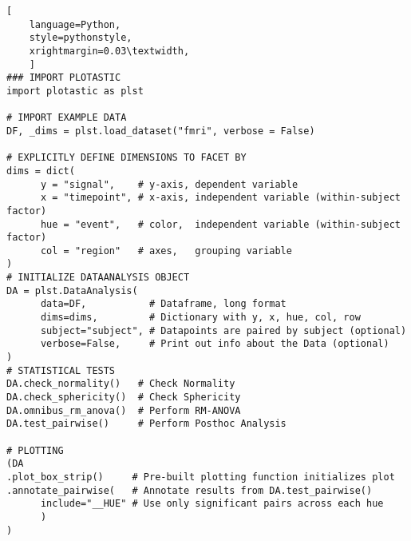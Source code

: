 \begin{lstlisting}[
    language=Python, 
    style=pythonstyle,
    xrightmargin=0.03\textwidth,
    ]
### IMPORT PLOTASTIC
import plotastic as plst

# IMPORT EXAMPLE DATA
DF, _dims = plst.load_dataset("fmri", verbose = False)

# EXPLICITLY DEFINE DIMENSIONS TO FACET BY
dims = dict(
      y = "signal",    # y-axis, dependent variable
      x = "timepoint", # x-axis, independent variable (within-subject factor)
      hue = "event",   # color,  independent variable (within-subject factor)
      col = "region"   # axes,   grouping variable
)
# INITIALIZE DATAANALYSIS OBJECT
DA = plst.DataAnalysis(
      data=DF,           # Dataframe, long format
      dims=dims,         # Dictionary with y, x, hue, col, row 
      subject="subject", # Datapoints are paired by subject (optional)
      verbose=False,     # Print out info about the Data (optional)
)
# STATISTICAL TESTS
DA.check_normality()   # Check Normality
DA.check_sphericity()  # Check Sphericity
DA.omnibus_rm_anova()  # Perform RM-ANOVA
DA.test_pairwise()     # Perform Posthoc Analysis

# PLOTTING
(DA
.plot_box_strip()     # Pre-built plotting function initializes plot
.annotate_pairwise(   # Annotate results from DA.test_pairwise()
      include="__HUE" # Use only significant pairs across each hue
      ) 
)
\end{lstlisting}






